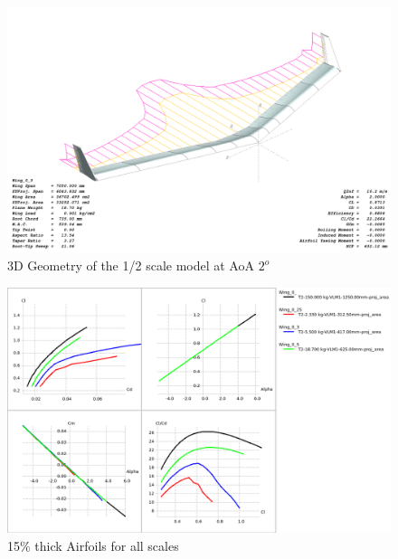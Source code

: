 \documentclass[titlepage,10pt]{article}
\begin{document}
\begin{landscape}
	\begin{figure}
	\begin{center}
	\includegraphics[width=220mm]{XFLR_3Dview_simple.png}
	\end{center}
	\caption{3D Geometry of the 1/2 scale model at AoA $2^o$}
	\label{fig:xflr3D}
	\end{figure}
\end{landscape}

\begin{landscape}
	\begin{figure}
	\begin{center}
	\includegraphics[width=220mm]{scale_original_airfoil_15.png}
	\end{center}
	\caption{15\% thick Airfoils for all scales}
	\label{fig:tc15}
	\end{figure}
\end{landscape}
\end{document}
